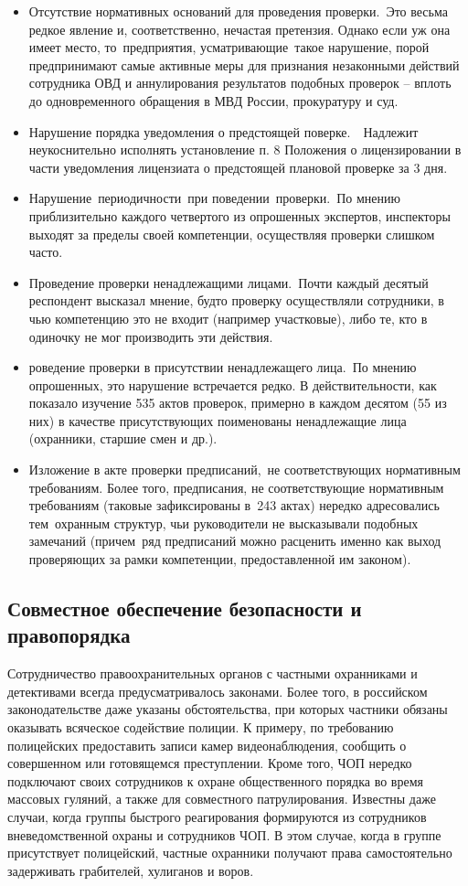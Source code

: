 \documentclass[a4paper,12pt,fleqn]{article} %
\begin{document}
\begin{itemize}
	\item Отсутствие нормативных оснований для проведения проверки. Это весьма редкое явление и, соответственно, нечастая претензия. Однако если уж она имеет место, то предприятия, усматривающие такое нарушение, порой предпринимают самые активные меры для признания незаконными действий сотрудника ОВД и аннулирования результатов подобных проверок – вплоть до одновременного обращения в МВД России, прокуратуру и суд.
	\item Нарушение порядка уведомления о предстоящей поверке.  Надлежит неукоснительно исполнять установление п. 8 Положения о лицензировании в части уведомления лицензиата о предстоящей плановой проверке за 3 дня.
	\item Нарушение периодичности при поведении проверки. По мнению приблизительно каждого четвертого из опрошенных экспертов, инспекторы выходят за пределы своей компетенции, осуществляя проверки слишком часто. 
	\item Проведение проверки ненадлежащими лицами. Поч­ти каждый десятый респондент высказал мнение, будто проверку осуществляли сотрудники, в чью компетенцию это не входит (например участковые), либо те, кто в одиночку не мог производить эти действия.
	\item роведение проверки в присутствии ненадлежащего лица. По мнению опрошенных, это нарушение встречается редко. В действительности, как показало изучение 535 актов проверок, примерно в каждом десятом (55 из них) в качестве присутствующих поименованы ненадлежащие лица (охранники, старшие смен и др.).
	\item Изложение в акте проверки предписаний, не соответствующих нормативным требованиям. Более того, предписания, не соответствующие нормативным требованиям (таковые зафиксированы в 243 актах) нередко адресовались тем охранным структур, чьи руководители не высказывали подобных замечаний (причем ряд предписаний можно расценить именно как выход проверяющих за рамки компетенции, предоставленной им законом).
\end{itemize}

\subsection{Совместное обеспечение безопасности и правопорядка}

Сотрудничество правоохранительных органов с частными охранниками и детективами всегда предусматривалось законами. Более того, в российском законодательстве даже указаны обстоятельства, при  которых частники обязаны оказывать всяческое содействие полиции. К примеру, по требованию полицейских предоставить записи камер видеонаблюдения, сообщить о совершенном или готовящемся преступлении. Кроме того, ЧОП нередко подключают своих сотрудников к охране общественного порядка во время массовых гуляний, а также для совместного патрулирования. Известны даже случаи, когда группы быстрого реагирования формируются из сотрудников вневедомственной охраны и сотрудников ЧОП. В этом случае, когда в группе присутствует полицейский, частные охранники получают права самостоятельно задерживать грабителей, хулиганов и воров.
\end{document}
